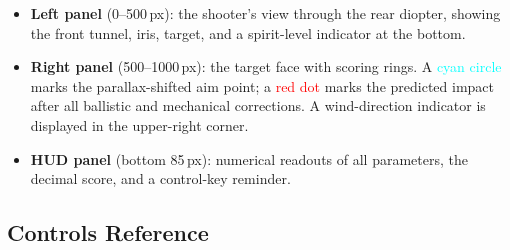 \documentclass[11pt]{article}
\begin{document}
\begin{itemize}[nosep]
  \item \textbf{Left panel} (0--500\,px): the shooter's view through
        the rear diopter, showing the front tunnel, iris, target, and
        a spirit-level indicator at the bottom.
  \item \textbf{Right panel} (500--1000\,px): the target face with
        scoring rings. A \textcolor{cyan}{cyan circle} marks the
        parallax-shifted aim point; a \textcolor{red}{red dot} marks
        the predicted impact after all ballistic and mechanical
        corrections.  A wind-direction indicator is displayed in the
        upper-right corner.
  \item \textbf{HUD panel} (bottom 85\,px): numerical readouts of
        all parameters, the decimal score, and a control-key reminder.
\end{itemize}

\subsection{Controls Reference}\label{sec:controls}
\end{document}
